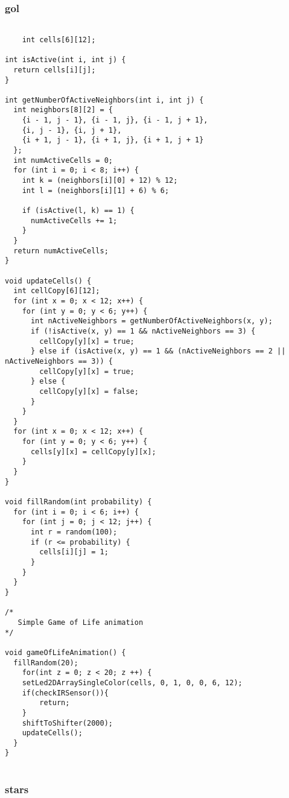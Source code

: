 \documentclass[12pt,a4paper]{article}
\begin{document}
\subsubsection{gol}

\begin{lstlisting}[language=Arduino]

    int cells[6][12];

int isActive(int i, int j) {
  return cells[i][j];
}

int getNumberOfActiveNeighbors(int i, int j) {
  int neighbors[8][2] = {
    {i - 1, j - 1}, {i - 1, j}, {i - 1, j + 1},
    {i, j - 1}, {i, j + 1},
    {i + 1, j - 1}, {i + 1, j}, {i + 1, j + 1}
  };
  int numActiveCells = 0;
  for (int i = 0; i < 8; i++) {
    int k = (neighbors[i][0] + 12) % 12;
    int l = (neighbors[i][1] + 6) % 6;

    if (isActive(l, k) == 1) {
      numActiveCells += 1;
    }
  }
  return numActiveCells;
}

void updateCells() {
  int cellCopy[6][12];
  for (int x = 0; x < 12; x++) {
    for (int y = 0; y < 6; y++) {
      int nActiveNeighbors = getNumberOfActiveNeighbors(x, y);
      if (!isActive(x, y) == 1 && nActiveNeighbors == 3) {
        cellCopy[y][x] = true;
      } else if (isActive(x, y) == 1 && (nActiveNeighbors == 2 || nActiveNeighbors == 3)) {
        cellCopy[y][x] = true;
      } else {
        cellCopy[y][x] = false;
      }
    }
  }
  for (int x = 0; x < 12; x++) {
    for (int y = 0; y < 6; y++) {
      cells[y][x] = cellCopy[y][x];
    }
  }
}

void fillRandom(int probability) {
  for (int i = 0; i < 6; i++) {
    for (int j = 0; j < 12; j++) {
      int r = random(100);
      if (r <= probability) {
        cells[i][j] = 1;
      }
    }
  }
}

/*
   Simple Game of Life animation
*/

void gameOfLifeAnimation() {
  fillRandom(20);
    for(int z = 0; z < 20; z ++) {
    setLed2DArraySingleColor(cells, 0, 1, 0, 0, 6, 12);
    if(checkIRSensor()){
        return;
    }
    shiftToShifter(2000);
    updateCells();
  }
}
    
\end{lstlisting}

\subsubsection{stars}
\end{document}
